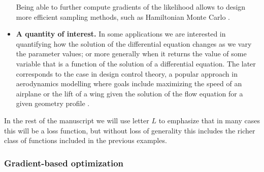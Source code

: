 \begin{itemize}
    Being able to further compute gradients of the likelihood allows to design more efficient sampling methods, such as Hamiltonian Monte Carlo \cite{Betancourt_2017}.
    \item \textbf{A quantity of interest.} In some applications we are interested in quantifying how the solution of the differential equation changes as we vary the parameter values; or more generally when it returns the value of some variable that is a function of the solution of a differential equation. The later corresponds to the case in design control theory, a popular approach in aerodynamics modelling where goals include maximizing the speed of an airplane or the lift of a wing given the solution of the flow equation for a given geometry profile \cite{Jameson_1988,Giles:2000wp,Mohammadi:2004dg}. 
\end{itemize}
In the rest of the manuscript we will use letter $L$ to emphasize that in many cases this will be a loss function, but without loss of generality this includes the richer class of functions included in the previous examples. 

\subsubsection{Gradient-based optimization}

